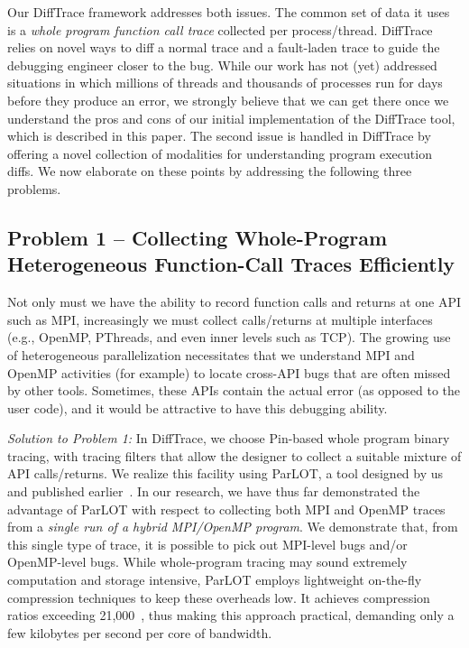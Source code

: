 Our DiffTrace framework addresses both issues.
%
The common set of data it uses is a {\em whole program
function call trace} collected per process/thread.
%
DiffTrace relies on
novel ways to diff a normal trace and a fault-laden trace to guide the
debugging engineer closer to the bug.
%
While our work has not (yet) addressed situations in
which millions of threads and thousands of processes run
for days before they produce an error,
we strongly believe that we can get there
once we understand the pros and cons of our initial
implementation of the DiffTrace tool, which is described in this paper.
%
The second issue is handled in DiffTrace by offering a novel
collection of modalities for understanding program execution diffs.
%
We now elaborate on these points by addressing the following three problems.



\subsection{Problem 1 -- Collecting Whole-Program Heterogeneous Function-Call Traces
Efficiently\/} Not only must we have the ability
to record function calls and returns at one
API such as MPI, increasingly we must collect calls/returns at multiple
interfaces (e.g., OpenMP, PThreads, and even inner levels such as TCP).
%
The growing use of heterogeneous parallelization necessitates that we
understand MPI and OpenMP activities (for example) to locate cross-API
bugs that are often missed by other tools.
%
Sometimes, these APIs contain the actual error (as opposed to the user code), and it would be attractive to have this debugging ability.


{\em Solution to Problem 1:\/}
In DiffTrace, we choose Pin-based whole program binary tracing, with
tracing filters that allow the designer to collect a suitable mixture of API
calls/returns.
%
We realize this facility using
ParLOT, a tool designed by us and published earlier~\cite{parlot}.
%
In our research, we have thus far demonstrated the advantage of
ParLOT with respect to collecting both MPI and OpenMP traces
from a {\em single run of a hybrid MPI/OpenMP program}.
%
We demonstrate that, from this single type of trace, it is possible
to pick out MPI-level bugs and/or OpenMP-level bugs.
%
While whole-program tracing
may sound extremely computation and storage intensive, ParLOT employs
lightweight on-the-fly compression techniques to keep these overheads low.
%
It achieves compression ratios exceeding 21,000~\cite{parlot},
thus making this approach practical, demanding
only a few kilobytes per second per core of bandwidth.


